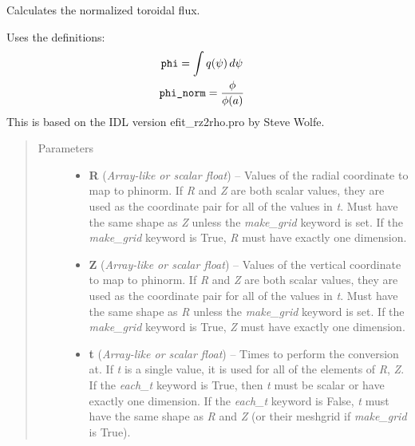 \documentclass[letterpaper,10pt,english]{sphinxmanual}
\begin{document}
\begin{fulllineitems}
\begin{fulllineitems}
\end{fulllineitems}


\begin{fulllineitems}
\label{eqtools:eqtools.core.Equilibrium.rz2phinorm}
Calculates the normalized toroidal flux.

Uses the definitions:
\begin{gather}
\begin{split}\texttt{phi} &= \int q(\psi)\,d\psi\end{split}\notag\\\begin{split}\texttt{phi\_norm} &= \frac{\phi}{\phi(a)}\end{split}\notag
\end{gather}
This is based on the IDL version efit\_rz2rho.pro by Steve Wolfe.
\begin{quote}\begin{description}
\item[{Parameters}] \leavevmode\begin{itemize}
\item {} 
\textbf{R} (\emph{Array-like or scalar float}) -- Values of the radial coordinate to
map to phinorm. If \emph{R} and \emph{Z} are both scalar values,
they are used as the coordinate pair for all of the values in
\emph{t}. Must have the same shape as \emph{Z} unless the \emph{make\_grid}
keyword is set. If the \emph{make\_grid} keyword is True, \emph{R} must
have exactly one dimension.

\item {} 
\textbf{Z} (\emph{Array-like or scalar float}) -- Values of the vertical coordinate to
map to phinorm. If \emph{R} and \emph{Z} are both scalar values,
they are used as the coordinate pair for all of the values in
\emph{t}. Must have the same shape as \emph{R} unless the \emph{make\_grid}
keyword is set. If the \emph{make\_grid} keyword is True, \emph{Z} must
have exactly one dimension.

\item {} 
\textbf{t} (\emph{Array-like or scalar float}) -- Times to perform the conversion at.
If \emph{t} is a single value, it is used for all of the elements of
\emph{R}, \emph{Z}. If the \emph{each\_t} keyword is True, then \emph{t} must be
scalar or have exactly one dimension. If the \emph{each\_t} keyword is
False, \emph{t} must have the same shape as \emph{R} and \emph{Z} (or their
meshgrid if \emph{make\_grid} is True).


\end{itemize}
\end{description}
\end{quote}
\end{fulllineitems}
\end{fulllineitems}
\end{document}

